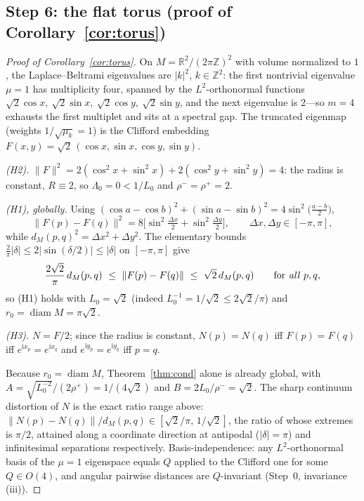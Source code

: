 \documentclass[review,supplement]{siamart220329}
\begin{document}
\subsection*{Step 6: the flat torus (proof of Corollary~\ref{cor:torus})}
\begin{proof}[Proof of Corollary~\ref{cor:torus}]
On $M=\mathbb{R}^2/(2\pi\mathbb{Z})^2$ with volume normalized to $1$, the
Laplace--Beltrami eigenvalues are $\lvert k\rvert^2$, $k\in\mathbb{Z}^2$: the
first nontrivial eigenvalue $\mu=1$ has multiplicity four, spanned by the
$L^2$-orthonormal functions $\sqrt2\cos x,\ \sqrt2\sin x,\ \sqrt2\cos y,\
\sqrt2\sin y$, and the next eigenvalue is $2$---so $m=4$ exhausts the first
multiplet and sits at a spectral gap. The truncated eigenmap (weights
$1/\sqrt{\mu_k}=1$) is the Clifford embedding
$F(x,y)=\sqrt2\,(\cos x,\sin x,\cos y,\sin y)$.

\emph{(H2).} $\lVert F\rVert^2=2(\cos^2x+\sin^2x)+2(\cos^2y+\sin^2y)=4$:
the radius is constant, $R\equiv2$, so $\Lambda_0=0<1/L_0$ and
$\rho^-=\rho^+=2$.

\emph{(H1), globally.} Using
$(\cos a-\cos b)^2+(\sin a-\sin b)^2=4\sin^2\!\big(\tfrac{a-b}2\big)$,
\[
\lVert F(p)-F(q)\rVert^2
=8\Big[\sin^2\tfrac{\Delta x}{2}+\sin^2\tfrac{\Delta y}{2}\Big],
\qquad \Delta x,\Delta y\in[-\pi,\pi],
\]
while $d_M(p,q)^2=\Delta x^2+\Delta y^2$. The elementary bounds
$\tfrac{2}{\pi}\lvert\delta\rvert\le2\lvert\sin(\delta/2)\rvert\le
\lvert\delta\rvert$ on $[-\pi,\pi]$ give
\[
\frac{2\sqrt2}{\pi}\,d_M(p,q)\ \le\ \lVert F(p)-F(q)\rVert\ \le\ \sqrt2\,d_M(p,q)
\qquad\text{for \emph{all} } p,q,
\]
so (H1) holds with $L_0=\sqrt2$ (indeed $L_0^{-1}=1/\sqrt2\le2\sqrt2/\pi$) and
$r_0=\operatorname{diam}M=\pi\sqrt2$.

\emph{(H3).} $N=F/2$; since the radius is constant, $N(p)=N(q)$ iff $F(p)=F(q)$
iff $e^{\mathrm i x_p}=e^{\mathrm i x_q}$ and
$e^{\mathrm i y_p}=e^{\mathrm i y_q}$ iff $p=q$.

Because $r_0=\operatorname{diam}M$, Theorem~\ref{thm:cond} alone is already
global, with $A=\sqrt{L_0^{-2}}/(2\rho^+)=1/(4\sqrt2)$ and
$B=2L_0/\rho^-=\sqrt2$. The sharp continuum distortion of $N$ is the exact
ratio range above: $\lVert N(p)-N(q)\rVert/d_M(p,q)\in[\sqrt2/\pi,\,1/\sqrt2]$,
the ratio of whose extremes is $\pi/2$, attained along a coordinate direction at
antipodal ($\lvert\delta\rvert=\pi$) and infinitesimal separations
respectively. Basis-independence: any $L^2$-orthonormal basis of the $\mu=1$
eigenspace equals $Q$ applied to the Clifford one for some $Q\in O(4)$, and
angular pairwise distances are $Q$-invariant (Step~0, invariance (iii)).
\end{proof}
\end{document}

